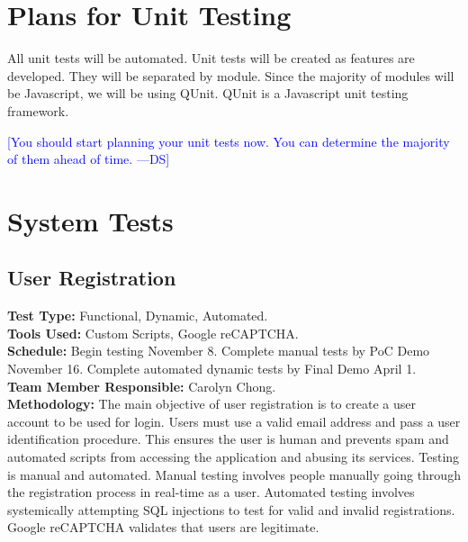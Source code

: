 \documentclass[12pt]{article}
\newcommand{\authornote}[3]{\textcolor{#1}{[#3 ---#2]}}
\newcommand{\authornote}[3]{}
\newcommand{\ds}[1]{\authornote{blue}{DS}{#1}}
\begin{document}
\section{Plans for Unit Testing}
All unit tests will be automated. Unit tests will be created as features are developed. They will be separated by module. Since the majority of modules will be Javascript, we will be using QUnit. QUnit is a Javascript unit testing framework. 

\ds{You should start planning your unit tests now. You can determine the
majority of them ahead of time.}

\section{System Tests}

\subsection{User Registration} 
\textbf{Test Type:} Functional, Dynamic, Automated. \\
\textbf{Tools Used:} Custom Scripts, Google reCAPTCHA. \\
\textbf{Schedule:} Begin testing November 8. Complete manual tests by PoC Demo November 16. Complete automated dynamic tests by Final Demo April 1. \\
\textbf{Team Member Responsible:} Carolyn Chong.\\
\textbf{Methodology:} The main objective of user registration is to create a user account to be used for login. Users must use a valid email address and pass a user identification procedure. This ensures the user is human and prevents spam and automated scripts from accessing the application and abusing its services. Testing is manual and automated. Manual testing involves people manually going through the registration process in real-time as a user. Automated testing involves systemically attempting SQL injections to test for valid and invalid registrations. Google reCAPTCHA validates that users are legitimate.
\end{document}
